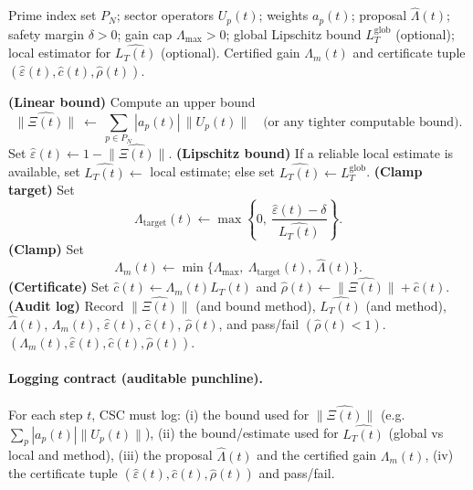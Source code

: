 \begin{algorithm}[t]
\caption{CSC (per-step certificate + gain clamping; global/local/hybrid)}
\label{alg:csc}
\begin{algorithmic}[1]
\Require Prime index set $P_N$; sector operators $U_p(t)$; weights $a_p(t)$; proposal $\widehat{\Lambda}(t)$; safety margin $\delta>0$;
gain cap $\Lambda_{\max}>0$; global Lipschitz bound $L_T^{\mathrm{glob}}$ (optional); local estimator for $\widehat{L_T(t)}$ (optional).
\Ensure Certified gain $\Lambda_m(t)$ and certificate tuple $(\widehat{\varepsilon}(t),\widehat{c}(t),\widehat{\rho}(t))$.
\vspace{0.25em}

\State \textbf{(Linear bound)} Compute an upper bound
\[
\widehat{\|\Xi(t)\|}\ \leftarrow\ \sum_{p\in P_N}|a_p(t)|\,\|U_p(t)\|
\quad\text{(or any tighter computable bound).}
\]
\State Set $\widehat{\varepsilon}(t)\leftarrow 1-\widehat{\|\Xi(t)\|}$.
\State \textbf{(Lipschitz bound)} If a reliable local estimate is available, set $\widehat{L_T(t)}\leftarrow$ local estimate; else set $\widehat{L_T(t)}\leftarrow L_T^{\mathrm{glob}}$.
\State \textbf{(Clamp target)} Set
\[
\Lambda_{\mathrm{target}}(t)\leftarrow \max\left\{0,\ \frac{\widehat{\varepsilon}(t)-\delta}{\widehat{L_T(t)}}\right\}.
\]
\State \textbf{(Clamp)} Set
\[
\Lambda_m(t)\leftarrow \min\{\Lambda_{\max},\ \Lambda_{\mathrm{target}}(t),\ \widehat{\Lambda}(t)\}.
\]
\State \textbf{(Certificate)} Set $\widehat{c}(t)\leftarrow \Lambda_m(t)\widehat{L_T(t)}$ and $\widehat{\rho}(t)\leftarrow \widehat{\|\Xi(t)\|}+\widehat{c}(t)$.
\State \textbf{(Audit log)} Record $\widehat{\|\Xi(t)\|}$ (and bound method), $\widehat{L_T(t)}$ (and method), $\widehat{\Lambda}(t)$, $\Lambda_m(t)$, $\widehat{\varepsilon}(t)$, $\widehat{c}(t)$, $\widehat{\rho}(t)$, and pass/fail $(\widehat{\rho}(t)<1)$.
\State \Return $(\Lambda_m(t),\widehat{\varepsilon}(t),\widehat{c}(t),\widehat{\rho}(t))$.
\end{algorithmic}
\end{algorithm}

\paragraph{Logging contract (auditable punchline).}
For each step $t$, CSC must log:
(i) the bound used for $\widehat{\|\Xi(t)\|}$ (e.g.\ $\sum_p |a_p(t)|\|U_p(t)\|$),
(ii) the bound/estimate used for $\widehat{L_T(t)}$ (global vs local and method),
(iii) the proposal $\widehat{\Lambda}(t)$ and the certified gain $\Lambda_m(t)$,
(iv) the certificate tuple $(\widehat{\varepsilon}(t),\widehat{c}(t),\widehat{\rho}(t))$ and pass/fail.
